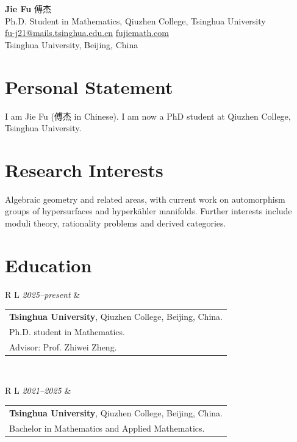 \documentclass[11pt,a4paper]{article}
\newcommand{\datedentry}[2]{%
  \begin{tabularx}{\textwidth}{R L}
    #1 & #2 \\
  \end{tabularx}\vspace{1pt}
}
\begin{document}
\begin{center}
  {\LARGE \textbf{Jie Fu} \; 傅杰}\\[3pt]
  Ph.D. Student in Mathematics, Qiuzhen College, Tsinghua University\\[3pt]
  \href{mailto:fu-j21@mails.tsinghua.edu.cn}{fu-j21@mails.tsinghua.edu.cn}
  \;\textbar\;
  \href{https://fujiemath.com}{fujiemath.com}
  \\[3pt]
  Tsinghua University, Beijing, China
\end{center}

\section{Personal Statement}

I am Jie Fu (傅杰 in Chinese).
I am now a PhD student at Qiuzhen College, Tsinghua University.

\section{Research Interests}
Algebraic geometry and related areas, with current work on automorphism groups of hypersurfaces and hyperkähler manifolds. Further interests include moduli theory, rationality problems and derived categories.

\section{Education}
\datedentry{\textit{2025--present}}{%
\begin{tabular}{l}
     \textbf{Tsinghua University}, Qiuzhen College, Beijing, China.\\
      Ph.D. student in Mathematics.\\
      Advisor: Prof. Zhiwei Zheng.\\
\end{tabular}

}

\datedentry{\textit{2021--2025}}{%
  \begin{tabular}{l}
     \textbf{Tsinghua University}, Qiuzhen College, Beijing, China.\\
      Bachelor in Mathematics and Applied Mathematics.
\end{tabular}
}
\end{document}
